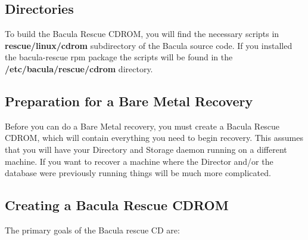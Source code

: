 \subsection*{Directories}

To build the Bacula Rescue CDROM, you will find the necessary scripts in {\bf
rescue/linux/cdrom} subdirectory of the Bacula source code. If you installed
the bacula-rescue rpm package the scripts will be found in the {\bf
/etc/bacula/rescue/cdrom} directory. 

\subsection*{Preparation for a Bare Metal Recovery}

Before you can do a Bare Metal recovery, you must create a Bacula Rescue
CDROM, which will contain everything you need to begin recovery. This assumes
that you will have your Directory and Storage daemon running on a different
machine. If you want to recover a machine where the Director and/or the
database were previously running things will be much more complicated. 

\subsection*{Creating a Bacula Rescue CDROM}

The primary goals of the Bacula rescue CD are: 


